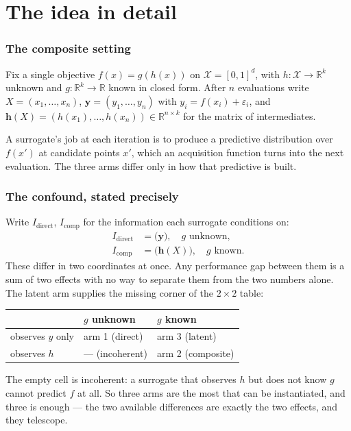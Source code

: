 \documentclass[11pt]{article}
\newcommand{\R}{\mathbb{R}}
\newcommand{\Xs}{\mathcal{X}}
\begin{document}
\part{The idea in detail}
\label{part:idea}

\section{The composite setting}

Fix a single objective $f(x)=g(h(x))$ on $\Xs=[0,1]^d$, with
$h:\Xs\to\R^k$ unknown and $g:\R^k\to\R$ known in closed form. After $n$
evaluations write $X=(x_1,\dots,x_n)$, $\mathbf{y}=(y_1,\dots,y_n)$ with
$y_i=f(x_i)+\varepsilon_i$, and
$\mathbf{h}(X)=(h(x_1),\dots,h(x_n))\in\R^{n\times k}$ for the matrix of
intermediates.

A surrogate's job at each iteration is to produce a predictive distribution over
$f(x')$ at candidate points $x'$, which an acquisition function turns into the
next evaluation. The three arms differ only in how that predictive is built.

\section{The confound, stated precisely}

Write $I_{\text{direct}}$, $I_{\text{comp}}$ for the information each surrogate
conditions on:
\begin{align}
I_{\text{direct}} &= \bigl(\mathbf{y}\bigr), \quad g \text{ unknown},\\
I_{\text{comp}}   &= \bigl(\mathbf{h}(X)\bigr), \quad g \text{ known}.
\end{align}
These differ in two coordinates at once. Any performance gap between them is a
sum of two effects with no way to separate them from the two numbers alone. The
latent arm supplies the missing corner of the $2\times2$ table:
\begin{center}
\begin{tabular}{lll}
\toprule
 & $g$ unknown & $g$ known \\
\midrule
observes $y$ only      & arm 1 (direct)  & arm 3 (latent) \\
observes $h$           & --- (incoherent) & arm 2 (composite) \\
\bottomrule
\end{tabular}
\end{center}
The empty cell is incoherent: a surrogate that observes $h$ but does not know
$g$ cannot predict $f$ at all. So three arms are the most that can be
instantiated, and three is enough --- the two available differences are exactly
the two effects, and they telescope.
\end{document}
